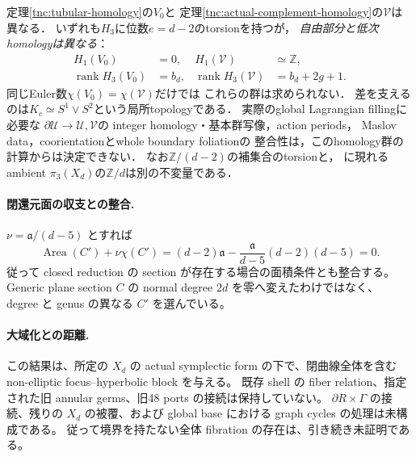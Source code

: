\begin{remark}
\label{tnc:complement-distinction}
定理\ref{tnc:tubular-homology}の$V_0$と
定理\ref{tnc:actual-complement-homology}の$\mathcal V$は異なる．
いずれも$H_3$に位数$e=d-2$のtorsionを持つが，
\emph{自由部分と低次homologyは異なる}：
\[
 \begin{aligned}
 H_1(V_0)&=0,& H_1(\mathcal V)&\simeq\mathbb Z,\\
 \operatorname{rank}H_3(V_0)&=b_d,&
 \operatorname{rank}H_3(\mathcal V)&=b_d+2g+1 .
 \end{aligned}
\]
同じEuler数$\chi(V_0)=\chi(\mathcal V)$だけでは
これらの群は求められない．
差を支えるのは$K_c\simeq S^1\vee S^2$という局所topologyである．
実際のglobal Lagrangian fillingに必要な
$\partial\mathcal U\to\mathcal U,\mathcal V$の
integer homology・基本群写像，action periods，
Maslov data，coorientationとwhole boundary foliationの
整合性は，このhomology群の計算からは決定できない．
なお$\mathbb Z/(d-2)$の補集合のtorsionと，
\cite[\S2.1]{randal-williams-hypersurface}に現れる
ambient $\pi_3(X_d)$の$\mathbb Z/d$は別の不変量である．
\end{remark}

\paragraph{閉還元面の収支との整合.}
$\nu=\mathfrak a/(d-5)$ とすれば
\[
 \operatorname{Area}(C')+\nu\chi(C')
 =(d-2)\mathfrak a-\frac{\mathfrak a}{d-5}(d-2)(d-5)=0.
\]
従って closed reduction の section が存在する場合の面積条件とも整合する。
Generic plane section $C$ の normal degree $2d$ を零へ変えたわけではなく、
degree と genus の異なる $C'$ を選んでいる。

\paragraph{大域化との距離.}
この結果は、所定の $X_d$ の actual symplectic form の下で、閉曲線全体を含む
non-elliptic focus--hyperbolic block を与える。
既存 shell の fiber relation、指定された旧 annular germs、旧48 ports の接続は保持していない。
$\partial R\times\Gamma$ の接続、残りの $X_d$ の被覆、および global base における graph cycles の処理は未構成である。
従って境界を持たない全体 fibration の存在は、引き続き未証明である。
